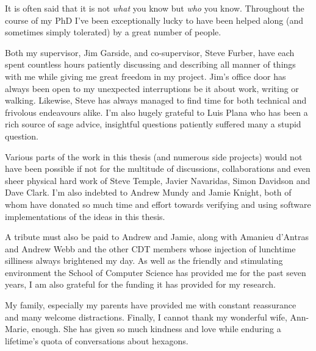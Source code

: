 {
	
	
	It is often said that it is not \emph{what} you know but \emph{who} you know.
	Throughout the course of my PhD I've been exceptionally lucky to have been
	helped along (and sometimes simply tolerated) by a great number of people.
	
	Both my supervisor, Jim Garside, and co-supervisor, Steve Furber, have each
	spent countless hours patiently discussing and describing all manner of
	things with me while giving me great freedom in my project. Jim's office door
	has always been open to my unexpected interruptions be it about work, writing
	or walking.  Likewise, Steve has always managed to find time for both
	technical and frivolous endeavours alike. I'm also hugely grateful to Luis
	Plana who has been a rich source of sage advice, insightful questions
	patiently suffered many a stupid question.
	
	Various parts of the work in this thesis (and numerous side projects) would
	not have been possible if not for the multitude of discussions,
	collaborations and even sheer physical hard work of Steve Temple, Javier
	Navaridas, Simon Davidson and Dave Clark. I'm also indebted to Andrew Mundy
	and Jamie Knight, both of whom have donated so much time and effort towards
	verifying and using software implementations of the ideas in this thesis.
	
	A tribute must also be paid to Andrew and Jamie, along with Amanieu d'Antras
	and Andrew Webb and the other CDT members whose injection of lunchtime
	silliness always brightened my day. As well as the friendly and stimulating
	environment the School of Computer Science has provided me for the past seven
	years, I am also grateful for the funding it has provided for my research.
	
	My family, especially my parents have provided me with constant reassurance
	and many welcome distractions. Finally, I cannot thank my wonderful wife,
	Ann-Marie, enough. She has given so much kindness and love while enduring a
	lifetime's quota of conversations about hexagons.
	
	\par%
}
